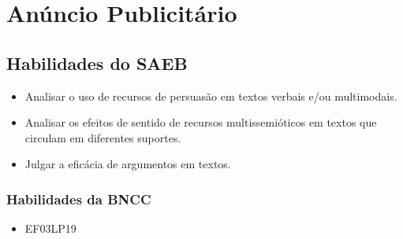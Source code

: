 \chapter{Anúncio Publicitário}


\section*{Habilidades do SAEB}

\begin{itemize}
\item Analisar o uso de recursos de persuasão em textos verbais e/ou multimodais.

\item Analisar os efeitos de sentido de recursos multissemióticos em textos que circulam em diferentes suportes.

\item Julgar a eficácia de argumentos em textos.
\end{itemize}

\subsection{Habilidades da BNCC}

\begin{itemize}
	\item 
EF03LP19
\end{itemize}

